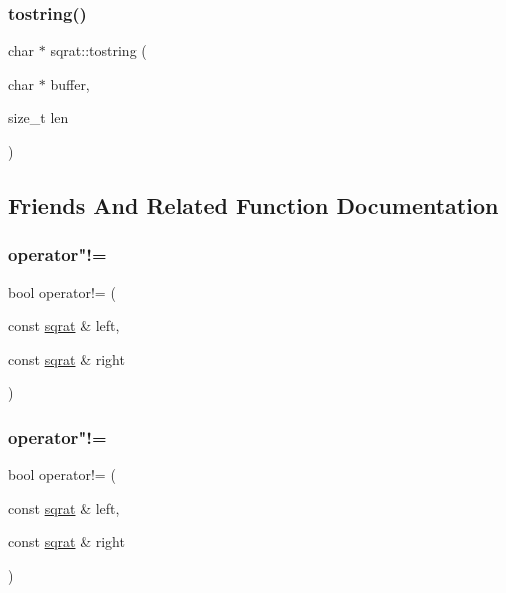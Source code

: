 \subsubsection{\texorpdfstring{tostring()}{tostring()}\hspace{0.1cm}{\footnotesize\ttfamily [2/2]}}
{\footnotesize\ttfamily char $\ast$ sqrat\+::tostring (\begin{DoxyParamCaption}\item[{char $\ast$}]{buffer,  }\item[{size\+\_\+t}]{len }\end{DoxyParamCaption})}



\subsection{Friends And Related Function Documentation}
\mbox{\label{classsqrat_ae100dba56606c0cfbbe45c04ae9f462a}} 
\subsubsection{\texorpdfstring{operator"!=}{operator!=}\hspace{0.1cm}{\footnotesize\ttfamily [1/2]}}
{\footnotesize\ttfamily bool operator!= (\begin{DoxyParamCaption}\item[{const \mbox{\hyperlink{classsqrat}{sqrat}} \&}]{left,  }\item[{const \mbox{\hyperlink{classsqrat}{sqrat}} \&}]{right }\end{DoxyParamCaption})\hspace{0.3cm}{\ttfamily [friend]}}

\mbox{\label{classsqrat_ae100dba56606c0cfbbe45c04ae9f462a}} 
\subsubsection{\texorpdfstring{operator"!=}{operator!=}\hspace{0.1cm}{\footnotesize\ttfamily [2/2]}}
{\footnotesize\ttfamily bool operator!= (\begin{DoxyParamCaption}\item[{const \mbox{\hyperlink{classsqrat}{sqrat}} \&}]{left,  }\item[{const \mbox{\hyperlink{classsqrat}{sqrat}} \&}]{right }\end{DoxyParamCaption})\hspace{0.3cm}{\ttfamily [friend]}}

